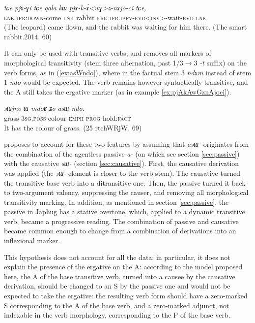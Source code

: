\documentclass[oneside,a4paper,11pt]{article}
\newcommand{\ipa}[1]{\mbox{\phon\textit{#1}}} %
\begin{document}
\begin{exe}
\ex \label{ex:pjAkAwGznAjoci}
\gll
\ipa{tɕe} 	\ipa{pjɤ-ɣi} 	\ipa{tɕe} 	\ipa{qala} 	\ipa{kɯ} 	\ipa{pjɤ-k-ɤ́<wɣ>z-nɤjo-ci} 	\ipa{tɕe,} \\
\textsc{lnk} \textsc{ifr:down}-come \textsc{lnk} rabbit \textsc{erg} \textsc{ifr.ipfv-evd<inv>}-wait-\textsc{evd} \textsc{lnk} \\
\glt (The leopard) came down, and the rabbit was waiting for him there. (The smart rabbit.2014, 60)
\end{exe}

It can only be used with transitive verbs, and removes all markers of morphological transitivity (stem three alternation, past 1/3$\rightarrow$3 \ipa{-t} suffix) on the verb forms, as in (\ref{ex:asWndo}), where in the factual stem 3 \ipa{ndɤm} instead of stem 1 \ipa{ndo} would be expected. The verb remains however syntactically transitive, and the A still takes the ergative marker (as in example \ref{ex:pjAkAwGznAjoci}).


\begin{exe}
\ex \label{ex:asWndo}
\gll
\ipa{sɯjno} 	\ipa{ɯ-mdoʁ} 	\ipa{ʑo} 	\ipa{asɯ-ndo.} \\
grass \textsc{3sg.poss}-colour \textsc{emph} \textsc{prog}-hold:\textsc{fact} \\
\glt It has the colour of grass. (25 rtchWRjW, 69)
\end{exe}

\citet{jacques16prog} proposes to account for these two features by assuming that \ipa{asɯ-} originates from the combination of the agentless passive \ipa{a-} (on which see section \ref{sec:passive}) with the causative \ipa{sɯ-} (section \ref{sec:causative}). First, the causative derivation was applied (the \ipa{sɯ-} element is closer to the verb stem). The causative turned the transitive base verb into a ditransitive one. Then, the passive turned it back to two-argument valency, suppressing the causer, and removing all morphological transitivity marking. In addition, as mentioned in section \ref{sec:passive}, the passive in Japhug  has a stative overtone, which, applied to a dynamic transitive verb, became a progressive reading. The combination of passive and causative became common enough to change from a combination of derivations into an inflexional marker.

This hypothesis does not account for all the data; in particular, it does not explain the presence of the ergative on the A: according to the model proposed here, the A of the base transitive verb, turned into a causee by the causative derivation, should be changed to an S by the passive one and would not be expected to take the ergative: the resulting verb form should have a zero-marked S corresponding to the A of the base verb, and a zero-marked adjunct, not indexable in the verb morphology, corresponding to the P of the base verb.  
\end{document}
